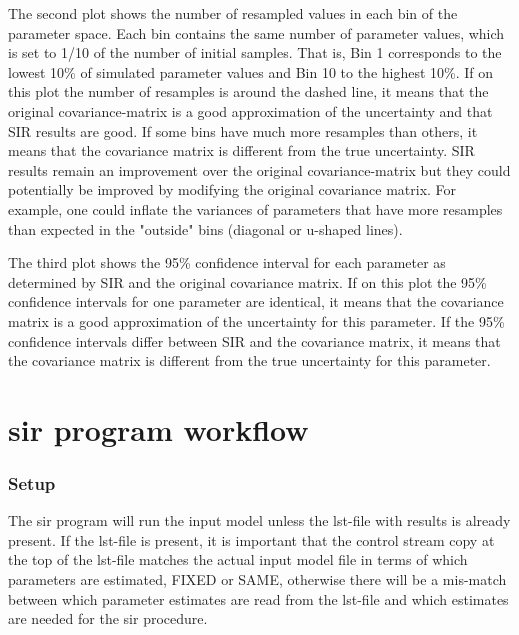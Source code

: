 The second plot shows the number of resampled values in each bin of the parameter space. 
Each bin contains the same number of parameter values, which is set to 1/10 of the number of initial samples.
That is, Bin 1 corresponds to the lowest 10\% of simulated parameter values and Bin 10 to the highest 10\%.
If on this plot the number of resamples is around the dashed line, it means that the original covariance-matrix 
is a good approximation of the uncertainty and that SIR results are good.
If some bins have much more resamples than others, it means that the covariance matrix is different from the true uncertainty. 
SIR results remain an improvement over the original covariance-matrix but they could potentially be improved by modifying the 
original covariance matrix.
For example, one could inflate the variances of parameters that have more resamples than expected in the "outside" bins 
(diagonal or u-shaped lines).

The third plot shows the 95\% confidence interval for each parameter as determined by SIR and the original covariance matrix.
If on this plot the 95\% confidence intervals for one parameter are identical, it means that the covariance matrix 
is a good approximation of the uncertainty for this parameter.
If the 95\% confidence intervals differ between SIR and the covariance matrix, it means that the covariance matrix is 
different from the true uncertainty for this parameter.

\section{sir program workflow}
\subsubsection*{Setup} 
The sir program will run the input model unless the lst-file with results is already present. If the lst-file is present, it
is important that the control stream copy at the top of the lst-file matches the
actual input model file in terms of which parameters are estimated, 
FIXED or SAME, otherwise there will be a mis-match between which parameter estimates are read from the
lst-file and which estimates are needed for the sir procedure.

